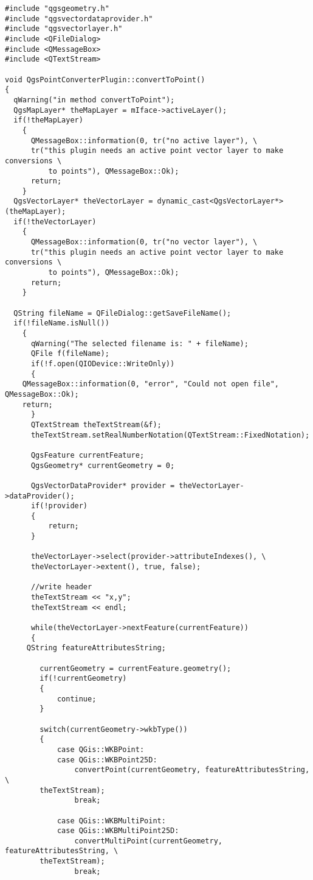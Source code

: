 \begin{verbatim}
#include "qgsgeometry.h"
#include "qgsvectordataprovider.h"
#include "qgsvectorlayer.h"
#include <QFileDialog>
#include <QMessageBox>
#include <QTextStream>

void QgsPointConverterPlugin::convertToPoint()
{
  qWarning("in method convertToPoint");
  QgsMapLayer* theMapLayer = mIface->activeLayer();
  if(!theMapLayer)
    {
      QMessageBox::information(0, tr("no active layer"), \
      tr("this plugin needs an active point vector layer to make conversions \ 
          to points"), QMessageBox::Ok);
      return;
    }
  QgsVectorLayer* theVectorLayer = dynamic_cast<QgsVectorLayer*>(theMapLayer);
  if(!theVectorLayer)
    {
      QMessageBox::information(0, tr("no vector layer"), \
      tr("this plugin needs an active point vector layer to make conversions \
          to points"), QMessageBox::Ok);
      return;
    }
  
  QString fileName = QFileDialog::getSaveFileName();
  if(!fileName.isNull())
    {
      qWarning("The selected filename is: " + fileName);
      QFile f(fileName);
      if(!f.open(QIODevice::WriteOnly))
      {
	QMessageBox::information(0, "error", "Could not open file", QMessageBox::Ok);
	return;
      }
      QTextStream theTextStream(&f);
      theTextStream.setRealNumberNotation(QTextStream::FixedNotation);

      QgsFeature currentFeature;
      QgsGeometry* currentGeometry = 0;

      QgsVectorDataProvider* provider = theVectorLayer->dataProvider();
      if(!provider)
      {
          return;
      }

      theVectorLayer->select(provider->attributeIndexes(), \
      theVectorLayer->extent(), true, false);

      //write header
      theTextStream << "x,y";
      theTextStream << endl;

      while(theVectorLayer->nextFeature(currentFeature))
      {
	 QString featureAttributesString;
      
        currentGeometry = currentFeature.geometry();
        if(!currentGeometry)
        {
            continue;
        }

        switch(currentGeometry->wkbType())
        {
            case QGis::WKBPoint:
            case QGis::WKBPoint25D:
                convertPoint(currentGeometry, featureAttributesString, \
		theTextStream);
                break;

            case QGis::WKBMultiPoint:
            case QGis::WKBMultiPoint25D:
                convertMultiPoint(currentGeometry, featureAttributesString, \
		theTextStream);
                break;


\end{verbatim}
